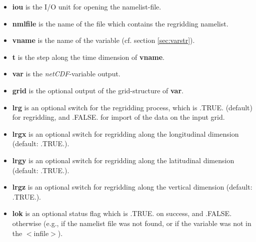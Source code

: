 \documentclass[12pt, a4paper]{article}
\begin{document}
\begin{itemize}
\item {\bf iou} is the I/O unit for opening the namelist-file.
\item {\bf nmlfile} is the name of the file which contains the regridding
                      namelist.
\item {\bf vname} is the name of the variable
                      (cf. section \ref{sec:varstr}).
\item {\bf t} is the step along the time dimension of {\bf vname}.
\item {\bf var} is the {\it netCDF}-variable output.
\item {\bf grid} is the optional output of the grid-structure
                 of {\bf var}.
\item {\bf lrg} is an optional switch for the regridding process, which
                is .TRUE. (default) for regridding, and .FALSE. for
                import of the data on the input grid.
\item {\bf lrgx} is an optional switch for regridding along the longitudinal
               dimension (default: .TRUE.).
\item {\bf lrgy} is an optional switch for regridding along the latitudinal
               dimension (default: .TRUE.).
\item {\bf lrgz} is an optional switch for regridding along the vertical
               dimension (default: .TRUE.).
\item {\bf lok} is an optional status flag which is .TRUE. on success, and
                .FALSE. otherwise (e.g., if the namelist file was not found,
                or if the variable was not in the $<$infile$>$).
\end{itemize}

\end{document}
